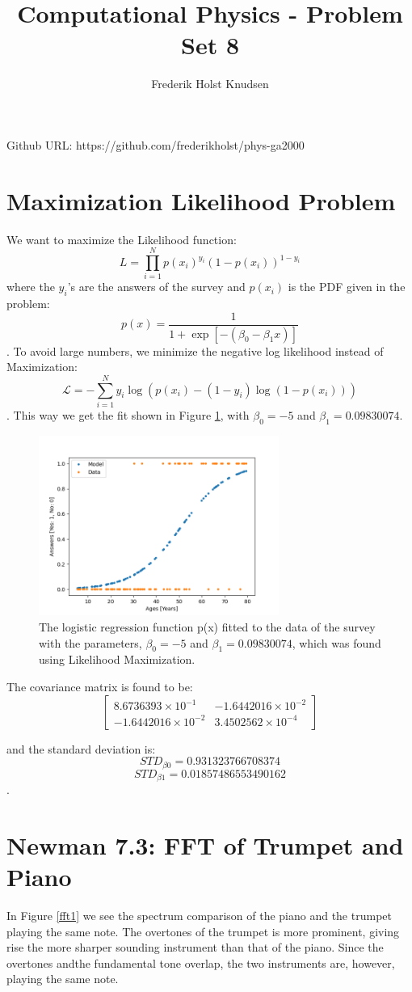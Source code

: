 \documentclass[11pt]{article}
\title{Computational Physics -  Problem Set 8}
\author{Frederik Holst Knudsen}
\begin{document}
\maketitle
Github URL: https://github.com/frederikholst/phys-ga2000
\section{Maximization Likelihood Problem}
We want to maximize the Likelihood function:
$$L=\prod_{i=1}^{N} p(x_i)^{y_i}(1-p(x_i))^{1-y_i}$$
where the $y_i$'s are the answers of the survey and $p(x_i)$ is the PDF given in the problem:
$$p(x)=\frac{1}{1+\exp [-(\beta_0-\beta_1 x)]}$$.
To avoid large numbers, we minimize the negative log likelihood instead of Maximization:
$$\mathcal{L}=-\sum_{i=1}^{N}y_i \log (p(x_i)-(1-y_i)\log (1-p(x_i))) $$.
This way we get the fit shown in Figure \ref{fit}, with $\beta_0=-5$ and $\beta_1=0.09830074$. 
\begin{figure}[!htbp]
    \centering
    \includegraphics[width=0.7\textwidth]{fit.png}
    \caption{The logistic regression function p(x) fitted to the data of the survey with the parameters, $\beta_0=-5$ and $\beta_1=0.09830074$, which was found using Likelihood Maximization.   }
    \label{fit}
\end{figure}


The covariance matrix is found to be:
\[
\begin{bmatrix}
8.6736393 \times 10^{-1} & -1.6442016 \times 10^{-2} \\
-1.6442016 \times 10^{-2} & 3.4502562 \times 10^{-4}
\end{bmatrix}
\]

and the standard deviation is: 
$$STD_{\beta 0}= 0.931323766708374$$
$$STD_{\beta 1}= 0.01857486553490162$$.



\section{Newman 7.3: FFT of Trumpet and Piano}
In Figure \ref{fft1} we see the spectrum comparison of the piano and the trumpet playing the same note. The overtones of the trumpet is more prominent, giving rise the more sharper sounding instrument than that of the piano. Since the overtones andthe fundamental tone overlap, the two instruments are, however, playing the same note. 
\end{document}
